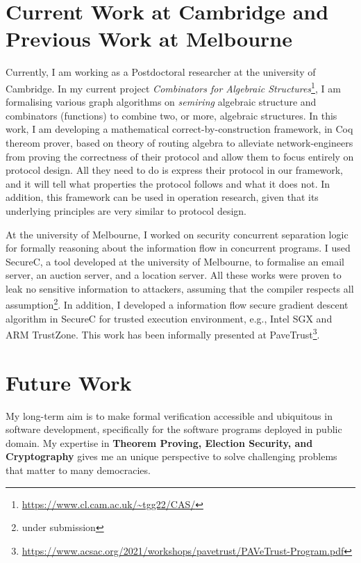\documentclass[a4paper]{article}
\begin{document}
\section{Current Work at Cambridge and Previous Work at Melbourne}
Currently, I am working as a Postdoctoral researcher at the university of Cambridge. 
In my current project \emph{Combinators for Algebraic Structures}\footnote{\url{https://www.cl.cam.ac.uk/~tgg22/CAS/}}, 
I am formalising various graph algorithms on \emph{semiring} algebraic 
structure and combinators (functions) to 
combine two, or more, algebraic structures. In this work, I am developing 
a mathematical correct-by-construction \cite{10.1007/978-3-319-66107-0_26} 
framework, in Coq thereom prover, based on theory of routing algebra 
\cite{10.1093/imamat/15.2.161, 10.1145/1080091.1080094} to alleviate network-engineers from 
proving the correctness of their protocol and allow them to focus entirely on protocol design.
All they need to do is express their protocol in our
framework, and it will tell what properties the protocol follows and what it does not. 
In addition, this framework can be used in operation
research, given that its underlying principles are very similar to protocol design.



At the university of Melbourne, I worked on 
security concurrent separation logic for formally reasoning about the information flow in concurrent programs. 
I used SecureC, a tool developed at the university of Melbourne, to formalise an email server, 
an auction server, and a location server. All these works were proven to leak no sensitive 
information to attackers, assuming that the compiler respects all assumption\footnote{under submission}. 
In addition, I developed a information flow secure gradient descent algorithm in SecureC for 
trusted execution environment, e.g., Intel SGX and ARM TrustZone. This work has been 
informally presented at PaveTrust\footnote{\url{https://www.acsac.org/2021/workshops/pavetrust/PAVeTrust-Program.pdf}}.


\section{Future Work}
My long-term aim is to make formal verification accessible and ubiquitous in 
software development, specifically for the software programs deployed in public domain. 
My expertise in \textbf{Theorem Proving, Election Security, and Cryptography}
gives me an unique perspective to solve challenging problems that matter to many democracies. 
\end{document}
